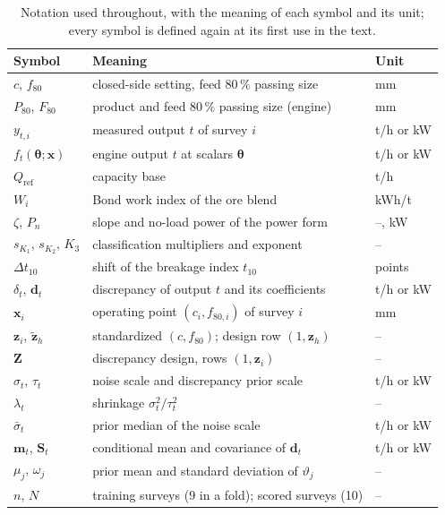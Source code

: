 \documentclass[journal]{IEEEtran}
\newcommand{\pct}{\,\%}
\begin{document}
\begin{table}[!t]
\caption{Notation used throughout, with the meaning of each symbol and its unit; every symbol is defined again at its first use in the text.}
\label{tab:notation}
\centering\footnotesize
\begin{tabular}{@{}l>{\raggedright\arraybackslash}p{}l@{}}
\toprule
Symbol & Meaning & Unit \\
\midrule
$c$, $f_{80}$ & closed-side setting, feed 80\pct{} passing size & mm \\
$P_{80}$, $F_{80}$ & product and feed 80\pct{} passing size (engine) & mm \\
$y_{t,i}$ & measured output $t$ of survey $i$ & t/h or kW \\
$f_t(\boldsymbol\theta;\mathbf x)$ & engine output $t$ at scalars $\boldsymbol\theta$ & t/h or kW \\
$Q_{\mathrm{ref}}$ & capacity base & t/h \\
$W_i$ & Bond work index of the ore blend & kWh/t \\
$\zeta$, $P_n$ & slope and no-load power of the power form & --, kW \\
$s_{K_1}$, $s_{K_2}$, $K_3$ & classification multipliers and exponent & -- \\
$\Delta t_{10}$ & shift of the breakage index $t_{10}$ & points \\
$\delta_t$, $\mathbf d_t$ & discrepancy of output $t$ and its coefficients & t/h or kW \\
$\mathbf x_i$ & operating point $(c_i,f_{80,i})$ of survey $i$ & mm \\
$\mathbf z_i$, $\tilde{\mathbf z}_h$ & standardized $(c,f_{80})$; design row $(1,\mathbf z_h)$ & -- \\
$\mathbf Z$ & discrepancy design, rows $(1,\mathbf z_i)$ & -- \\
$\sigma_t$, $\tau_t$ & noise scale and discrepancy prior scale & t/h or kW \\
$\lambda_t$ & shrinkage $\sigma_t^2/\tau_t^2$ & -- \\
$\bar\sigma_t$ & prior median of the noise scale & t/h or kW \\
$\mathbf m_t$, $\mathbf S_t$ & conditional mean and covariance of $\mathbf d_t$ & t/h or kW \\
$\mu_j$, $\omega_j$ & prior mean and standard deviation of $\vartheta_j$ & -- \\
$n$, $N$ & training surveys (9 in a fold); scored surveys (10) & -- \\

\end{tabular}
\end{table}
\end{document}
